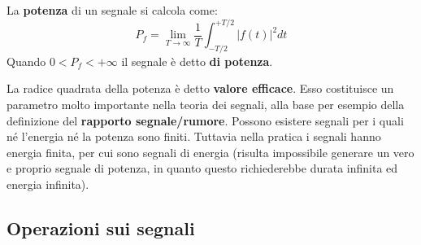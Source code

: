 \documentclass[a4paper, titlepage]{article}
\begin{document}
La \textbf{potenza} di un segnale si calcola come:
$$
	P_{f} = \lim_{T\rightarrow\infty} \frac{1}{T} \int_{-T/2}^{+T/2}|f(t)|^2dt
$$
Quando $0<P_{f}<+\infty$ il segnale è detto \textbf{di potenza}.

La radice quadrata della potenza è detto \textbf{valore efficace}. Esso costituisce un parametro molto importante nella teoria dei segnali, alla base per esempio della definizione del \textbf{rapporto segnale/rumore}.
Possono esistere segnali per i quali né l'energia né la potenza sono finiti. Tuttavia nella pratica i segnali hanno energia finita, per cui sono segnali di energia 
(risulta impossibile generare un vero e proprio segnale di potenza, in quanto questo richiederebbe durata infinita ed energia infinita).

\subsection{Operazioni sui segnali}
\end{document}
